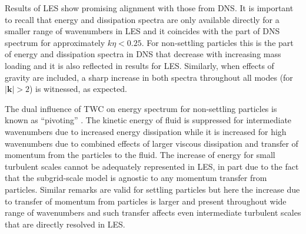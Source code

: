 \documentclass{pracamgren}
\begin{document}
Results of LES show promising alignment with those from DNS.
It is important to recall that energy and dissipation spectra are only available directly for a smaller range of wavenumbers in LES and it coincides with the part of DNS spectrum for approximately ${k \eta < 0.25}$.
For non-settling particles this is the part of energy and dissipation spectra in DNS that decrease with increasing mass loading and it is also reflected in results for LES.
Similarly, when effects of gravity are included, a sharp increase in both spectra throughout all modes (for $|\mathbf{k}| > 2$) is witnessed, as expected.

The dual influence of TWC on energy spectrum for non-settling particles is known as ``pivoting'' \parencite{Squires1990,Bosse2006,Rosa2020}.
The kinetic energy of fluid is suppressed for intermediate wavenumbers due to increased energy dissipation while it is increased for high wavenumbers due to combined effects of larger viscous dissipation and transfer of momentum from the particles to the fluid.
The increase of energy for small turbulent scales cannot be adequately represented in LES, in part due to the fact that the subgrid-scale model is agnostic to any momentum transfer from particles. 
Similar remarks are valid for settling particles but here the increase due to transfer of momentum from particles is larger and present throughout wide range of wavenumbers and such transfer affects even intermediate turbulent scales that are directly resolved in LES.
\end{document}

